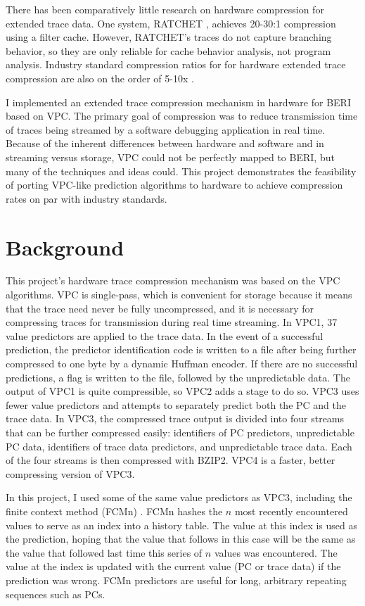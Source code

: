 \documentclass[conference]{IEEEtran}
\begin{document}
There has been comparatively little research on hardware compression for extended trace data. One system, RATCHET \cite{thatssoratchet}, achieves 20-30:1 compression using a filter cache. However, RATCHET's traces do not capture branching behavior, so they are only reliable for cache behavior analysis, not program analysis. Industry standard compression ratios for for hardware extended trace compression are also on the order of 5-10x \cite{hopkins2006}.  

I implemented an extended trace compression mechanism in hardware for BERI based on VPC. The primary goal of compression was to reduce transmission time of traces being streamed by a software debugging application in real time. Because of the inherent differences between hardware and software and in streaming versus storage, VPC could not be perfectly mapped to BERI, but many of the techniques and ideas could. This project demonstrates the feasibility of porting VPC-like prediction algorithms to hardware to achieve compression rates on par with industry standards. 


\section{Background}  
This project's hardware trace compression mechanism was based on the VPC algorithms. VPC is single-pass, which is convenient for storage because it means that the trace need never be fully uncompressed, and it is necessary for compressing traces for transmission during real time streaming. In VPC1, 37 value predictors are applied to the trace data. In the event of a successful prediction, the predictor identification code is written to a file after being further compressed to one byte by a dynamic Huffman encoder. If there are no successful predictions, a flag is written to the file, followed by the unpredictable data. The output of VPC1 is quite compressible, so VPC2 adds a stage to do so. VPC3 uses fewer value predictors and attempts to separately predict both the PC and the trace data. In VPC3, the compressed trace output is divided into four streams that can be further compressed easily: identifiers of PC predictors, unpredictable PC data, identifiers of trace data predictors, and unpredictable trace data. Each of the four streams is then compressed with BZIP2. VPC4 is a faster, better compressing version of VPC3.

In this project, I used some of the same value predictors as VPC3, including the finite context method (FCMn) \cite{sazeides1997}. FCMn hashes the $n$ most recently encountered values to serve as an index into a history table. The value at this index is used as the prediction, hoping that the value that follows in this case will be the same as the value that followed last time this series of $n$ values was encountered. The value at the index is updated with the current value (PC or trace data) if the prediction was wrong. FCMn predictors are useful for long, arbitrary repeating sequences such as PCs. 
\end{document}
